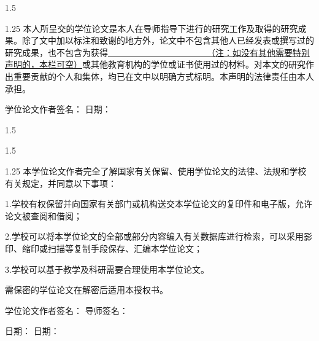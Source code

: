 \begin{titlepage}
\newpage %

\par\vskip30pt
\begin{spacing}{1.5}
\end{spacing}



\par\vskip20pt
\begin{spacing}{1.25}
本人所呈交的学位论文是本人在导师指导下进行的研究工作及取得的研究成果。除了文中加以标注和致谢的地方外，论文中不包含其他人已经发表或撰写过的研究成果，也不包含为获得\underline{~~~~~~~~~~~~~~~~~~~~~~~（注：如没有其他需要特别声明的，本栏可空）}或其他教育机构的学位或证书使用过的材料。对本文的研究作出重要贡献的个人和集体，均已在文中以明确方式标明。本声明的法律责任由本人承担。
\end{spacing}
\par\vskip60pt

学位论文作者签名：\hspace*{160pt} 日期：

\begin{spacing}{1.5}
\centering{- - - - - - - - - - - - - - - - - - - - - - - - - - - - - - - - - - - - - - - - - - - - - - - - - - - - - - - - - }
\end{spacing}

\begin{spacing}{1.5}
\end{spacing}

\par\vskip20pt
\begin{spacing}{1.25}
本学位论文作者完全了解国家有关保留、使用学位论文的法律、法规和学校有关规定，并同意以下事项：

1.学校有权保留并向国家有关部门或机构送交本学位论文的复印件和电子版，允许论文被查阅和借阅；

2.学校可以将本学位论文的全部或部分内容编入有关数据库进行检索，可以采用影印、缩印或扫描等复制手段保存、汇编本学位论文；

3.学校可以基于教学及科研需要合理使用本学位论文。

需保密的学位论文在解密后适用本授权书。
\end{spacing}
\par\vskip60pt
学位论文作者签名：\hspace*{160pt} 导师签名：
\par\vskip20pt
日期： \hspace*{231pt} 日期：
\restoregeometry %
\newpage %
\end{titlepage}



